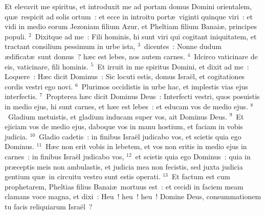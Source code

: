 \lettrine[lines=10,image=true,loversize=0.05,lraise=-0.03]{E}{}t elevavit me spiritus, et introduxit me ad portam domus Domini orientalem, qu\ae\ respicit ad solis ortum~: et ecce in introitu port\ae\ viginti quinque viri~: et vidi in medio eorum Jezoniam filium Azur, et Pheltiam filium Banai\ae , principes populi.
${}^{2}$~Dixitque ad me~: Fili hominis, hi sunt viri qui cogitant iniquitatem, et tractant consilium pessimum in urbe ista,
${}^{3}$~dicentes~: Nonne dudum \ae dificat\ae\ sunt domus~? h\ae c est lebes, nos autem carnes.
${}^{4}$~Idcirco vaticinare de eis, vaticinare, fili hominis.
${}^{5}$~Et irruit in me spiritus Domini, et dixit ad me~: Loquere~: H\ae c dicit Dominus~: Sic locuti estis, domus Isra\"el, et cogitationes cordis vestri ego novi.
${}^{6}$~Plurimos occidistis in urbe hac, et implestis vias ejus interfectis.
${}^{7}$~Propterea h\ae c dicit Dominus Deus~: Interfecti vestri, quos posuistis in medio ejus, hi sunt carnes, et h\ae c est lebes~: et educam vos de medio ejus.
${}^{8}$~Gladium metuistis, et gladium inducam super vos, ait Dominus Deus.
${}^{9}$~Et ejiciam vos de medio ejus, daboque vos in manu hostium, et faciam in vobis judicia.
${}^{10}$~Gladio cadetis~: in finibus Isra\"el judicabo vos, et scietis quia ego Dominus.
${}^{11}$~H\ae c non erit vobis in lebetem, et vos non eritis in medio ejus in carnes~: in finibus Isra\"el judicabo vos,
${}^{12}$~et scietis quia ego Dominus~: quia in pr\ae ceptis meis non ambulastis, et judicia mea non fecistis, sed juxta judicia gentium qu\ae\ in circuitu vestro sunt estis operati.
${}^{13}$~Et factum est cum prophetarem, Pheltias filius Banai\ae\ mortuus est~: et cecidi in faciem meam clamans voce magna, et dixi~: Heu~! heu~! heu~! Domine Deus, consummationem tu facis reliquiarum Isra\"el~?


